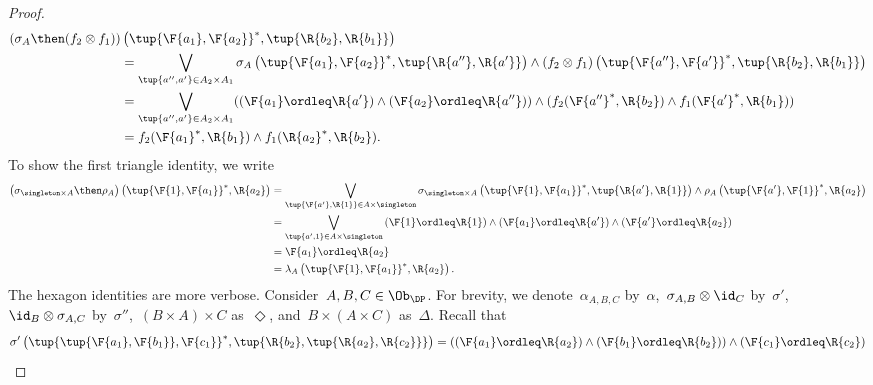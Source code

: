 \begin{proof}
    \begin{equation}
        \begin{aligned}
           \left( \sigma_A \then (f_2\otimes f_1)\right)&\left( \tup{\F{a_1},\F{a_2}}^*,\tup{\R{b_2},\R{b_1}}\right)\\
           &=\bigvee_{\tup{a'',a'}\in A_2\times A_1}\sigma_A\left(\tup{\F{a_1},\F{a_2}}^*,\tup{\R{a''},\R{a'}} \right)\wedge \left(f_2\otimes f_1\right) \left( \tup{\F{a''},\F{a'}}^*,\tup{\R{b_2},\R{b_1}}\right)\\
           &=\bigvee_{\tup{a'',a'}\in A_2\times A_1}(\left(\F{a_1}\ordleq \R{a'}\right)\wedge \left(\F{a_2}\ordleq \R{a''}\right)) \wedge (f_2(\F{a''}^*,\R{b_2})\wedge f_1(\F{a'}^*,\R{b_1}))\\
           &= f_2(\F{a_1}^*,\R{b_1}) \wedge f_1(\R{a_2}^*,\R{b_2}).
        \end{aligned}
    \end{equation}
    To show the first triangle identity, we write
    \begin{equation}
        \begin{aligned}
           \left(\sigma_{\singleton \times A}\then \rho_A\right)\left( \tup{\F{1},\F{a_1}}^*,\R{a_2}\right)&=\bigvee_{\tup{\F{a'},\R{1}}\in A\times \singleton}\sigma_{\singleton \times A}\left( \tup{\F{1},\F{a_1}}^*,\tup{\R{a'},\R{1}}\right)\wedge \rho_A\left( \tup{\F{a'},\F{1}}^*,\R{a_2}\right)\\
           &=\bigvee_{\tup{a',1}\in A\times \singleton} \left(\F{1}\ordleq \R{1}\right) \wedge \left(\F{a_1}\ordleq \R{a'}\right)\wedge \left(\F{a'}\ordleq \R{a_2}\right)\\
           &=\F{a_1}\ordleq \R{a_2}\\
           &=\lambda_A\left( \tup{\F{1},\F{a_1}}^*,\R{a_2}\right).
        \end{aligned}
    \end{equation}
    The hexagon identities are more verbose. Consider~$A,B,C\in \Ob_\DP$. For brevity, we denote~$\alpha_{A,B,C}$ by~$\alpha$,~$\sigma_{A,B}\otimes \id_C$ by~$\sigma'$,~$\id_B \otimes \sigma_{A,C}$ by~$\sigma''$,~$(B\times A)\times C$ as~$\Diamond$, and~$B\times (A\times C)$ as~$\Delta$. Recall that
    \begin{equation}
        \begin{aligned}
            \sigma' \left(\tup{\tup{\F{a_1},\F{b_1}},\F{c_1}}^*,\tup{\R{b_2},\tup{\R{a_2},\R{c_2}}} \right)&=\left( (\F{a_1}\ordleq \R{a_2})  \wedge (\F{b_1}\ordleq \R{b_2})\right)\wedge (\F{c_1}\ordleq \R{c_2})\\

\end{aligned}
\end{equation}
\end{proof}
